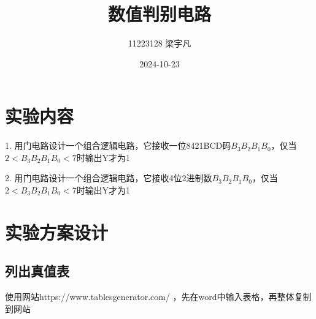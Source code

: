 \documentclass[a4paper,12pt]{article}
\begin{document}
\title {数值判别电路}
\author{11223128 梁宇凡}
\date{2024-10-23}
\maketitle

\section{实验内容}

1. 用门电路设计一个组合逻辑电路，它接收一位8421BCD码$B_3B_2B_1B_0$，仅当 $2<B_3B_2B_1B_0<7$时输出Y才为1

2. 用门电路设计一个组合逻辑电路，它接收4位2进制数$B_3B_2B_1B_0$，仅当 $2<B_3B_2B_1B_0<7$时输出Y才为1

\section{实验方案设计}
\subsection{列出真值表}
使用网站https://www.tablesgenerator.com/ ，先在word中输入表格，再整体复制到网站
\end{document}
